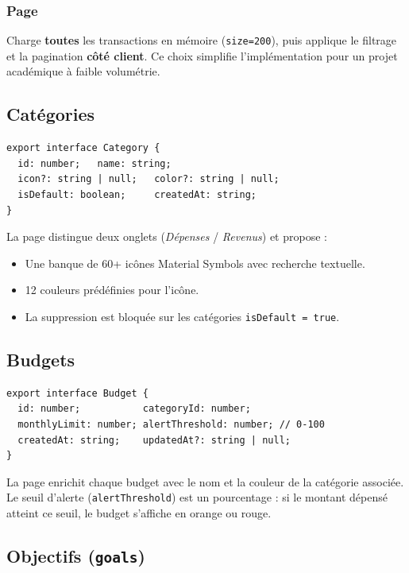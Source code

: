 \documentclass[12pt,a4paper]{article}
\begin{document}
\subsubsection{Page}

Charge \textbf{toutes} les transactions en mémoire (\texttt{size=200}),
puis applique le filtrage et la pagination \textbf{côté client}. Ce choix simplifie
l'implémentation pour un projet académique à faible volumétrie.

\subsection{Catégories}

\begin{lstlisting}
export interface Category {
  id: number;   name: string;
  icon?: string | null;   color?: string | null;
  isDefault: boolean;     createdAt: string;
}
\end{lstlisting}

La page distingue deux onglets (\textit{Dépenses} / \textit{Revenus}) et propose :
\begin{itemize}
  \item Une banque de 60+ icônes Material Symbols avec recherche textuelle.
  \item 12 couleurs prédéfinies pour l'icône.
  \item La suppression est bloquée sur les catégories \texttt{isDefault = true}.
\end{itemize}

\subsection{Budgets}

\begin{lstlisting}
export interface Budget {
  id: number;           categoryId: number;
  monthlyLimit: number; alertThreshold: number; // 0-100
  createdAt: string;    updatedAt?: string | null;
}
\end{lstlisting}

La page enrichit chaque budget avec le nom et la couleur de la catégorie associée.
Le seuil d'alerte (\texttt{alertThreshold}) est un pourcentage : si le montant
dépensé atteint ce seuil, le budget s'affiche en orange ou rouge.

\subsection{Objectifs (\texttt{goals})}
\end{document}
